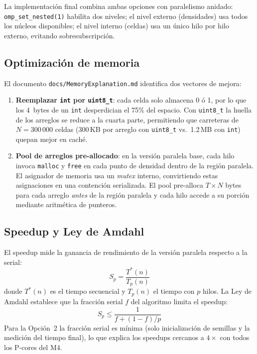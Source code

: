 \documentclass{article}
\begin{document}
La implementaci\'on final combina ambas opciones con paralelismo anidado:
\texttt{omp\_set\_nested(1)} habilita dos niveles; el nivel externo (densidades) usa
todos los n\'ucleos disponibles; el nivel interno (celdas) usa un \'unico hilo por hilo
externo, evitando sobresubscripci\'on.

\subsection{Optimizaci\'on de memoria}

El documento \texttt{docs/MemoryExplanation.md} identifica dos vectores de mejora:

\begin{enumerate}
    \item \textbf{Reemplazar \texttt{int} por \texttt{uint8\_t}}: cada celda solo almacena
          0 \'o 1, por lo que los 4~bytes de un \texttt{int} desperdician el 75\% del
          espacio. Con \texttt{uint8\_t} la huella de los arreglos se reduce a la cuarta
          parte, permitiendo que carreteras de $N=300\,000$ celdas (300\,KB por arreglo
          con \texttt{uint8\_t} vs.\ 1.2\,MB con \texttt{int}) quepan mejor en cach\'e.
    \item \textbf{Pool de arreglos pre-allocado}: en la versi\'on paralela base, cada
          hilo invoca \texttt{malloc} y \texttt{free} en cada punto de densidad dentro
          de la regi\'on paralela. El asignador de memoria usa un \emph{mutex} interno,
          convirtiendo estas asignaciones en una contenci\'on serializada. El pool
          pre-alloca $T \times N$ bytes para cada arreglo \emph{antes} de la regi\'on
          paralela y cada hilo accede a su porci\'on mediante aritm\'etica de punteros.
\end{enumerate}

\subsection{Speedup y Ley de Amdahl}

El speedup mide la ganancia de rendimiento de la versi\'on paralela respecto a la serial:
\[ S_p = \frac{T^*(n)}{T_p(n)} \]
donde $T^*(n)$ es el tiempo secuencial y $T_p(n)$ el tiempo con $p$ hilos. La Ley de
Amdahl \cite{amdahl} establece que la fracci\'on serial $f$ del algoritmo limita el
speedup:
\[ S_p \leq \frac{1}{f + (1-f)/p} \]
Para la Opci\'on~2 la fracci\'on serial es m\'inima (solo inicializaci\'on de semillas y
la medici\'on del tiempo final), lo que explica los speedups cercanos a $4\times$ con
todos los P-cores del M4.
\end{document}
